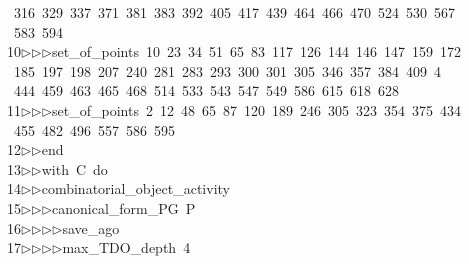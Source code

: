 \begin{tabbing}
\>\ 316\ 329\ 337\ 371\ 381\ 383\ 392\ 405\ 417\ 439\ 464\ 466\ 470\ 524\ 530\ 567\\[0pt]
\>\ 583\ 594\ \\[0pt]
10\>$\triangleright$\>$\triangleright$\>$\triangleright$\>set\_of\_points\ 10\ 23\ 34\ 51\ 65\ 83\ 117\ 126\ 144\ 146\ 147\ 159\ 172\ \\[0pt]
\ 185\ 197\ 198\ 207\ 240\ 281\ 283\ 293\ 300\ 301\ 305\ 346\ 357\ 384\ 409\ 4\\[0pt]
\ 444\ 459\ 463\ 465\ 468\ 514\ 533\ 543\ 547\ 549\ 586\ 615\ 618\ 628\ \\[0pt]
11\>$\triangleright$\>$\triangleright$\>$\triangleright$\>set\_of\_points\ 2\ 12\ 48\ 65\ 87\ 120\ 189\ 246\ 305\ 323\ 354\ 375\ 434\ \\[0pt]
\ 455\ 482\ 496\ 557\ 586\ 595\ \\[0pt]
12\>$\triangleright$\>$\triangleright$\>end\ \\[0pt]
13\>$\triangleright$\>$\triangleright$\>with\ C\ do\ \\[0pt]
14\>$\triangleright$\>$\triangleright$\>combinatorial\_object\_activity\ \\[0pt]
15\>$\triangleright$\>$\triangleright$\>$\triangleright$\>canonical\_form\_PG\ P\ \\[0pt]
16\>$\triangleright$\>$\triangleright$\>$\triangleright$\>$\triangleright$\>save\_ago\ \\[0pt]
17\>$\triangleright$\>$\triangleright$\>$\triangleright$\>$\triangleright$\>max\_TDO\_depth\ 4\ \\[0pt]

\end{tabbing}

